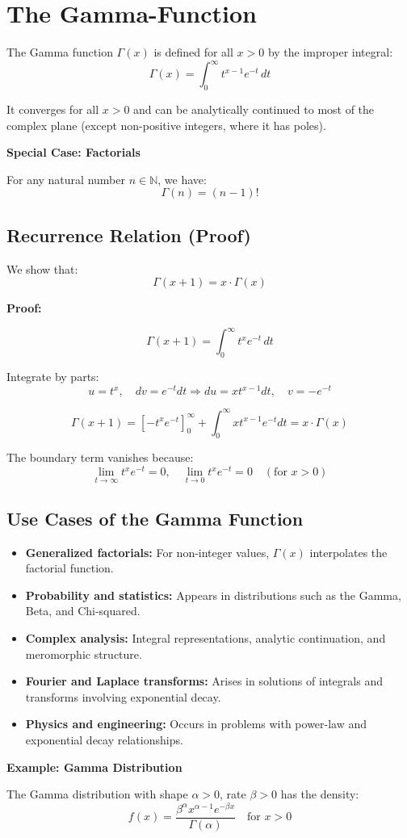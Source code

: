 \newpage
\section{The Gamma-Function}

The Gamma function \( \Gamma(x) \) is defined for all \( x > 0 \) by the improper integral:
\[
\Gamma(x) = \int_0^\infty t^{x-1} e^{-t} \,dt
\]

It converges for all \( x > 0 \) and can be analytically continued to most of the complex plane (except non-positive integers, where it has poles).

\textbf{Special Case: Factorials}

For any natural number \( n \in \mathbb{N} \), we have:
\[
\Gamma(n) = (n - 1)!
\]

\subsection{Recurrence Relation (Proof)}

We show that:
\[
\Gamma(x + 1) = x \cdot \Gamma(x)
\]

\textbf{Proof:}

\[
\Gamma(x + 1) = \int_0^\infty t^x e^{-t} \,dt
\]

Integrate by parts:
\[
u = t^x, \quad dv = e^{-t} dt \Rightarrow du = x t^{x-1} dt, \quad v = -e^{-t}
\]

\[
\Gamma(x + 1) = {\left[ -t^x e^{-t} \right]}_{0}^{\infty} + \int_0^\infty x t^{x-1} e^{-t} dt = x \cdot \Gamma(x)
\]

The boundary term vanishes because:
\[
\lim_{t \to \infty} t^x e^{-t} = 0, \quad \lim_{t \to 0} t^x e^{-t} = 0 \quad (\text{for } x > 0)
\]

\subsection{Use Cases of the Gamma Function}

\begin{itemize}[label=\(-\)]
    \item \textbf{Generalized factorials:} For non-integer values, \( \Gamma(x) \) interpolates the factorial function.
    \item \textbf{Probability and statistics:} Appears in distributions such as the Gamma, Beta, and Chi-squared.
    \item \textbf{Complex analysis:} Integral representations, analytic continuation, and meromorphic structure.
    \item \textbf{Fourier and Laplace transforms:} Arises in solutions of integrals and transforms involving exponential decay.
    \item \textbf{Physics and engineering:} Occurs in problems with power-law and exponential decay relationships.
\end{itemize}

\textbf{Example: Gamma Distribution}

The Gamma distribution with shape \( \alpha > 0 \), rate \( \beta > 0 \) has the density:
\[
f(x) = \frac{\beta^\alpha x^{\alpha - 1} e^{-\beta x}}{\Gamma(\alpha)} \quad \text{for } x > 0
\]
